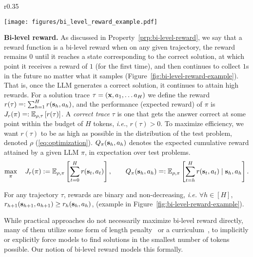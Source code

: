 \begin{wrapfigure}{r}{0.35\textwidth}
\vspace{-0.2cm}
  \begin{center}
    \texttt{[image: figures/bi\_level\_reward\_example.pdf]}
  \end{center}
  \vspace{-0.4cm}
  \caption{\footnotesize \textbf{\emph{Example of bi-level rewards:}} After step $1$ where reward is $1.0$, irrespective of future actions reward remains $1.0$.\vspace{-0.2cm}}
    \label{fig:bi-level-reward-example}
\end{wrapfigure}
\textbf{Bi-level reward.} 
As discussed in Property~\ref{prp:bi-level-reward}, we say that a reward function is a bi-level reward when on any given trajectory, the reward remains $0$ until it reaches a state corresponding to the correct solution, 
at which point it receives a reward of $1$ (for the first time), and then continues to collect $1$s in the future no matter what it samples (Figure~\ref{fig:bi-level-reward-example}).
That is, once the LLM generates a correct solution, it continues to attain high rewards.  
For a solution trace $\tau = (\mathbf{x}, a_1, \dots a_H)$ we define the reward  $r(\tau) \mathrel{\mathop=}:  \sum_{h=1}^H r(\mathbf{s}_h, a_h)$, and the performance (expected reward) of $\pi$ is $J_r(\pi) \mathrel{\mathop=}: \mathbb{E}_{\rho, \tau} \left[r(\tau)\right]$.
A \emph{correct trace} $\tau$ is one that gets the answer correct at some point within the budget of $H$ tokens, \textit{i.e.}, $r(\tau) > 0$. To maximize efficiency, we want $r(\tau)$ to be as high as possible in the distribution of the test problem, denoted $\rho$ (\cref{eq:optimization}). $Q_\pi(\mathbf{s}_h, a_h)$ denotes the expected cumulative reward attained by a given LLM $\pi$, in expectation over test problems.
{
\setlength{\abovedisplayskip}{5pt}
\setlength{\belowdisplayskip}{4pt}
\begin{align}
    \label{eq:optimization}
    \max_\pi~~~ J_r(\pi) := \mathbb{E}_{\rho, \pi} \left[ \sum_{t=0}^H r(\mathbf{s}_t, a_t)  \right],\quad\quad Q_\pi(\mathbf{s}_h, a_h) \mathrel{\mathop=}: \mathbb{E}_{\rho, \pi}\left [ \sum_{t=h}^H r(\mathbf{s}_t, a_t) \mid \mathbf{s}_h, a_h \right ].
\end{align}
}

\begin{tcolorbox}[colback=green!5!white,colframe=black,boxsep=0pt,top=4pt,bottom=4pt,left=3pt,right=3pt]
\begin{property}
\label{prp:bi-level-reward} For any trajectory $\tau$, rewards are binary and non-decreasing, \textit{i.e.} $\forall h \in [H]$, $r_{h+1} (\mathbf{s}_{h+1}, a_{h+1}) \geq r_{h} (\mathbf{s}_h, a_h)$, (example in Figure~\ref{fig:bi-level-reward-example}). 
\end{property}
\end{tcolorbox}
While practical approaches do not necessarily maximize bi-level reward directly, many of them utilize some form of length penalty~\citep{arora2025traininglanguagemodelsreason} or a curriculum~\citep{deepscaler2025}, to implicitly or explicitly force models to find solutions in the smallest number of tokens possible. Our notion of bi-level reward models this formally.

